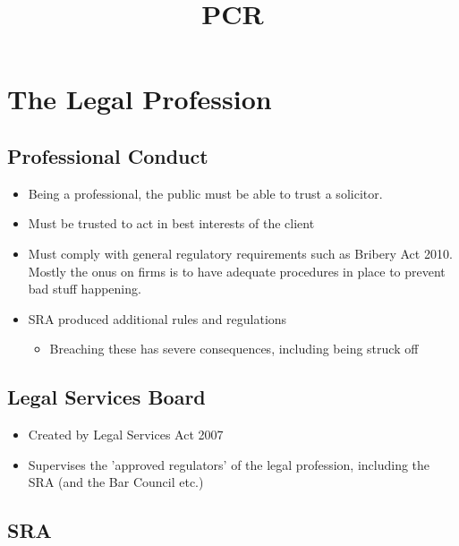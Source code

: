 \documentclass[
]{article}
\title{PCR}
\author{}
\date{}
\providecommand{\tightlist}{%
  \setlength{\itemsep}{0pt}\setlength{\parskip}{0pt}}
\begin{document}
\maketitle

{
\setcounter{tocdepth}{3}
\tableofcontents
}
\hypertarget{the-legal-profession}{%
\section{The Legal Profession}\label{the-legal-profession}}

\hypertarget{professional-conduct}{%
\subsection{Professional Conduct}\label{professional-conduct}}

\begin{itemize}
\tightlist
\item
  Being a professional, the public must be able to trust a solicitor.
\item
  Must be trusted to act in best interests of the client
\item
  Must comply with general regulatory requirements such as Bribery Act
  2010. Mostly the onus on firms is to have adequate procedures in place
  to prevent bad stuff happening.
\item
  SRA produced additional rules and regulations

  \begin{itemize}
  \tightlist
  \item
    Breaching these has severe consequences, including being struck off
  \end{itemize}
\end{itemize}

\hypertarget{legal-services-board}{%
\subsection{Legal Services Board}\label{legal-services-board}}

\begin{itemize}
\tightlist
\item
  Created by Legal Services Act 2007
\item
  Supervises the 'approved regulators' of the legal profession,
  including the SRA (and the Bar Council etc.)
\end{itemize}

\hypertarget{sra}{%
\subsection{SRA}\label{sra}}
\end{document}
